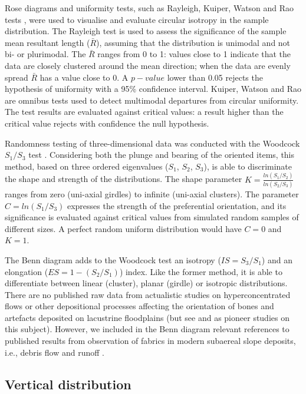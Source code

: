 \documentclass[preprint,authoryear,times]{elsarticle} %
\begin{document}
Rose diagrams and uniformity tests, such as Rayleigh, Kuiper, Watson and Rao tests \citep{Jammalamadaka2001}, were used to visualise and evaluate circular isotropy in the sample distribution. The Rayleigh test is used to assess the significance of the sample mean resultant length ($\bar{R}$), assuming that the distribution is unimodal and not bi- or plurimodal. The $\bar{R}$ ranges from 0 to 1: values close to 1 indicate that the data are closely clustered around the mean direction; when the data are evenly spread $\bar{R}$ has a value close to 0. A $p-value$ lower than 0.05 rejects the hypothesis of uniformity with a 95\% confidence interval. Kuiper, Watson and Rao are omnibus tests used to detect multimodal departures from circular uniformity. The test results are evaluated against critical values: a result higher than the critical value rejects with confidence the null hypothesis.

Randomness testing of three-dimensional data was conducted with the Woodcock $S_1/S_3$ test \citep{Woodcock1983}. Considering both the plunge and bearing of the oriented items, this method, based on three ordered eigenvalues ($S_1$, $S_2$, $S_3$), is able to discriminate the shape and strength of the distributions. The shape parameter $K=\frac{ln(S_1/S_2)}{ln(S_2/S_3)}$ ranges from zero (uni-axial girdles) to infinite (uni-axial clusters). The parameter $C=ln(S_1/S_3)$ expresses the strength of the preferential orientation, and its significance is evaluated against critical values from simulated random samples of different sizes. A perfect random uniform distribution would have $C=0$ and $K=1$.

The Benn diagram \citep{Benn1994} adds to the Woodcock test an isotropy ($IS=S_3/S_1$) and an elongation ($ES=1-(S_2/S_1)$) index. Like the former method, it is able to differentiate between linear (cluster), planar (girdle) or isotropic distributions. There are no %
published raw data from actualistic studies on hyperconcentrated flows or other depositional processes affecting the orientation of bones and artefacts deposited on lacustrine floodplains (but see \cite{Morton2004} and \cite{Cobo-Sanchez2014} as pioneer studies on this subject). However, we included in the Benn diagram relevant references to published results from observation of fabrics in modern subaereal slope deposits, i.e., debris flow and runoff \citep{Bertran1997,Lenoble2004}.

\subsection{Vertical distribution}
\end{document}
